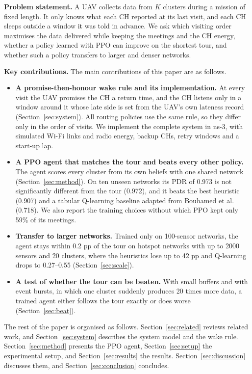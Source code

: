 \documentclass[conference]{IEEEtran}
\begin{document}
\textbf{Problem statement.} A UAV collects data from $K$ clusters during a mission of fixed
length. It only knows what each CH reported at its last visit, and each CH sleeps outside a
window it was told in advance. We ask which visiting order maximises the data delivered while
keeping the meetings and the CH energy, whether a policy learned with PPO can improve on the
shortest tour, and whether such a policy transfers to larger and denser networks.

\textbf{Key contributions.} The main contributions of this paper are as follows.
\begin{itemize}
  \item \textbf{A promise-then-honour wake rule and its implementation.} At every visit the UAV
  promises the CH a return time, and the CH listens only in a window around it whose late side
  is set from the UAV's own lateness record (Section~\ref{sec:system}). All routing policies use
  the same rule, so they differ only in the order of visits. We implement the complete system
  in ns-3, with simulated Wi-Fi links and radio energy, backup CHs, retry windows and a
  start-up lap.
  \item \textbf{A PPO agent that matches the tour and beats every other policy.} The agent
  scores every cluster from its own beliefs with one shared network (Section~\ref{sec:method}).
  On ten unseen networks its PDR of 0.973 is not significantly different from the tour (0.972),
  and it beats the best heuristic (0.907) and a tabular Q-learning baseline adapted from
  Bouhamed et al.\ \cite{bouhamed2020uav} (0.718). We also report the training choices without
  which PPO kept only 59\% of its meetings.
  \item \textbf{Transfer to larger networks.} Trained only on 100-sensor networks, the agent stays
  within 0.2 pp of the tour on hotspot networks with up to 2000 sensors and 20 clusters, where
  the heuristics lose up to 42 pp and Q-learning drops to 0.27--0.55 (Section~\ref{sec:scale}).
  \item \textbf{A test of whether the tour can be beaten.} With small buffers and with event
  bursts, in which one cluster suddenly produces 20 times more data, a trained agent either
  follows the tour exactly or does worse (Section~\ref{sec:beat}).
\end{itemize}

The rest of the paper is organised as follows. Section~\ref{sec:related} reviews related work,
and Section~\ref{sec:system} describes the system model and the wake rule.
Section~\ref{sec:method} presents the PPO agent, Section~\ref{sec:setup} the experimental setup,
and Section~\ref{sec:results} the results. Section~\ref{sec:discussion} discusses them, and
Section~\ref{sec:conclusion} concludes.
\end{document}
